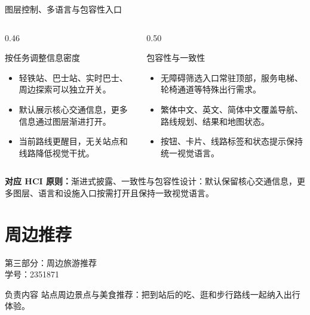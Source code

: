 \documentclass[aspectratio=169,10pt]{beamer}
\newcommand{\hciprinciple}[1]{\vspace{0.25em}\textcolor{MTRPurple}{\small\textbf{对应 HCI 原则：}#1}}
\newcommand{\speakerline}[2]{\centering{\Huge\bfseries #1}\\[0.8em]{\Large 学号：#2}\\[1.2em]}
\begin{document}
\begin{frame}{图层控制、多语言与包容性入口}
  \begin{columns}[T,onlytextwidth]
    \begin{column}{0.46\textwidth}
      \begin{block}{按任务调整信息密度}
        \begin{itemize}
          \item 轻铁站、巴士站、实时巴士、周边探索可以独立开关。
          \item 默认展示核心交通信息，更多信息通过图层渐进打开。
          \item 当前路线更醒目，无关站点和线路降低视觉干扰。
        \end{itemize}
      \end{block}
    \end{column}
    \begin{column}{0.50\textwidth}
      \begin{block}{包容性与一致性}
        \begin{itemize}
          \item 无障碍筛选入口常驻顶部，服务电梯、轮椅通道等特殊出行需求。
          \item 繁体中文、英文、简体中文覆盖导航、路线规划、结果和地图状态。
          \item 按钮、卡片、线路标签和状态提示保持统一视觉语言。
        \end{itemize}
      \end{block}
    \end{column}
  \end{columns}
  \hciprinciple{渐进式披露、一致性与包容性设计：默认保留核心交通信息，更多图层、语言和设施入口按需打开且保持一致视觉语言。}
\end{frame}

\section{周边推荐}
\begin{frame}{第三部分：周边旅游推荐}
  \speakerline{郎若谷}{2351871}
  \begin{block}{负责内容}
    站点周边景点与美食推荐：把到站后的吃、逛和步行路线一起纳入出行体验。
  \end{block}
\end{frame}
\end{document}

